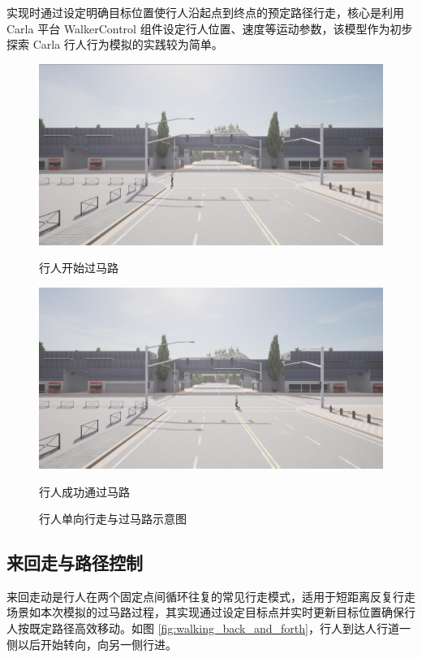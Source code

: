 实现时通过设定明确目标位置使行人沿起点到终点的预定路径行走，核心是利用 Carla 平台 WalkerControl 组件设定行人位置、速度等运动参数，该模型作为初步探索 Carla 行人行为模拟的实践较为简单。

\begin{figure}[H]
    \centering
    \begin{minipage}{0.8\textwidth} 
        \centering
        \includegraphics[width=\textwidth]{images/crossing_path1.pdf}
        \caption{行人开始过马路}
    \end{minipage}
    
    \vspace{0.5cm}  

    \begin{minipage}{0.8\textwidth}
        \centering
        \includegraphics[width=\textwidth]{images/crossing_path2.pdf}
        \caption{行人成功通过马路}
    \end{minipage}
    \caption{行人单向行走与过马路示意图}
    \label{fig:crossing_path}
\end{figure}

\subsection{来回走与路径控制}
来回走动是行人在两个固定点间循环往复的常见行走模式，适用于短距离反复行走场景如本次模拟的过马路过程，其实现通过设定目标点并实时更新目标位置确保行人按既定路径高效移动。如图 \ref{fig:walking_back_and_forth}，行人到达人行道一侧以后开始转向，向另一侧行进。

